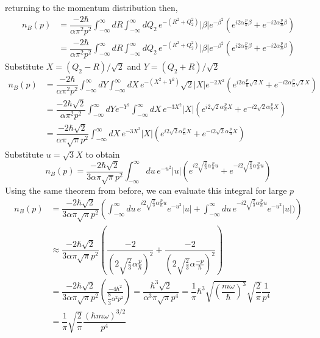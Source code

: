 \documentclass[onecolumn,english,aps,pra]{revtex4}
\begin{document}
returning to the momentum distribution then,
%
\begin{align*}
n_{B}(p) & = \dfrac{- 2\hbar }{\alpha \pi^2 p^2} \int_{-\infty}^{\infty} dR \int_{-\infty}^{\infty} dQ_{2} \,  e^{-(R^2 + Q_{2}^{2})} |\beta| e^{-\beta^2} (e^{i 2\alpha \frac{p}{\hbar} \beta} + e^{-i 2\alpha \frac{p}{\hbar} \beta}) \\
& = \dfrac{-2 \hbar }{\alpha \pi^2 p^2} \int_{-\infty}^{\infty} dR \int_{-\infty}^{\infty} dQ_{2} \,  e^{-(R^2 + Q_{2}^{2})} |\beta| e^{-\beta^2} (e^{i 2\alpha \frac{p}{\hbar} \beta} + e^{-i 2\alpha \frac{p}{\hbar} \beta})
\end{align*}
%
Substitute $X = (Q_{2} - R)/\sqrt{2}$ and $Y = (Q_2 + R)/ \sqrt{2}$
%
\begin{align*}
n_{B}(p) & = \dfrac{-2 \hbar }{\alpha \pi^2 p^2} \int_{-\infty}^{\infty} dY \int_{-\infty}^{\infty} dX \,  e^{-(X^2 + Y^{2})} \sqrt{2}|X| e^{-2 X^2} (e^{i 2\alpha \frac{p}{\hbar} \sqrt{2}X} + e^{-i 2\alpha \frac{p}{\hbar} \sqrt{2}X})\\
& = \dfrac{-2 \hbar \sqrt{2}}{\alpha \pi^2 p^2} \int_{-\infty}^{\infty} dY e^{-Y^2}\int_{-\infty}^{\infty} dX \,  e^{-3 X^2} |X| (e^{i 2 \sqrt{2}\alpha \frac{p}{\hbar}X} + e^{-i 2 \sqrt{2}\alpha \frac{p}{\hbar} X})\\
& = \dfrac{-2 \hbar \sqrt{2}}{\alpha \pi \sqrt{\pi} p^2} \int_{-\infty}^{\infty} dX \,  e^{-3 X^2} |X| (e^{i 2 \sqrt{2}\alpha \frac{p}{\hbar} X} + e^{-i 2 \sqrt{2}\alpha \frac{p}{\hbar} X})
\end{align*}
%
Substitute $u = \sqrt{3} X$ to obtain
%
\[
n_{B}(p) = \dfrac{-2 \hbar \sqrt{ 2 }}{3\alpha \pi \sqrt{\pi} p^2} \int_{-\infty}^{\infty} du \,  e^{-u^2} |u| (e^{i 2 \sqrt{ \frac{2}{3} }\alpha \frac{p}{\hbar} u} + e^{-i 2 \sqrt{ \frac{2}{3} }\alpha \frac{p}{\hbar} u})
\]
%
Using the same theorem from before, we can evaluate this integral for large $p$
\begin{align*}
n_{B}(p) & = \dfrac{-2 \hbar \sqrt{ 2 }}{3\alpha \pi \sqrt{\pi} p^2} 
\left( \int_{-\infty}^{\infty} du \,  e^{i 2 \sqrt{ \frac{2}{3} }\alpha \frac{p}{\hbar} u} e^{-u^2} |u| + \int_{-\infty}^{\infty} du \,  e^{-i 2 \sqrt{ \frac{2}{3} }\alpha \frac{p}{\hbar} u} e^{-u^2} |u|) \right)\\
& \approx \dfrac{-2 \hbar \sqrt{ 2 }}{3\alpha \pi \sqrt{\pi} p^2} 
\left(
\dfrac{-2}{(2 \sqrt{ \frac{2}{3} }\alpha \frac{p}{\hbar})^2}
 + \dfrac{-2}{(2 \sqrt{ \frac{2}{3} }\alpha \frac{-p}{\hbar})^2}
\right)\\
& = \dfrac{-2 \hbar \sqrt{ 2 }}{3\alpha \pi \sqrt{\pi} p^2}
\left(
\frac{-4 \hbar^2}{\dfrac{8}{3} \alpha^2 p^2}
\right) = 
\dfrac{\hbar^3 \sqrt{2}}{ \alpha^3 \pi \sqrt{\pi} p^4}
=
\dfrac{1}{\pi} \hbar^3 \sqrt{\left(\dfrac{m \omega}{\hbar}\right)^3} \sqrt{\dfrac{2}{\pi}} \dfrac{1}{p^4}\\
& = \dfrac{1}{\pi} \sqrt{\dfrac{2}{\pi}} \dfrac{(\hbar m \omega)^{3/2}}{p^4}
\end{align*}
\end{document}
